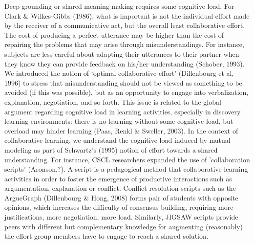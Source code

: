 \documentclass[twocolumn]{article}
\begin{document}
Deep grounding or shared meaning making requires some cognitive load. For Clark
\& Wilkes-Gibbs (1986), what is important is not the individual effort made by
the receiver of a communicative act, but the overall least collaborative effort.
The cost of producing a perfect utterance may be higher than the cost of
repairing the problems that may arise through misunderstandings. For instance,
subjects are less careful about adapting their utterances to their partner when
they know they can provide feedback on his/her understanding (Schober, 1993). We
introduced the notion of ‘optimal collaborative effort' (Dillenbourg et al,
1996) to stress that misunderstanding should not be viewed as something to be
avoided (if this was possible), but as an opportunity to engage into
verbalization, explanation, negotiation, and so forth. This issue is related to
the global argument regarding cognitive load in learning activities, especially
in discovery learning environments: there is no learning without some cognitive
load, but overload may hinder learning (Paas, Renkl \& Sweller, 2003). In the
context of collaborative learning, we understand the cognitive load induced by
mutual modeling as part of Schwartz's (1995) notion of effort towards a shared
understanding. For instance, CSCL researchers expanded the use of 'collaboration
scripts' (Aronson,?). A script is a pedagogical method that collaborative
learning activities in order to foster the emergence of productive interactions
such as argumentation, explanation or conflict. Conflict-resolution scripts such
as the ArgueGraph (Dillenbourg \& Hong, 2008) forms pair of students with
opposite opinions, which increases the difficulty of consensus building,
requiring more justifications, more negotiation, more load. Similarly, JIGSAW
scripts provide peers with different but complementary knowledge for augmenting
(reasonably) the effort group members have to engage to reach a shared solution. 
\end{document}
